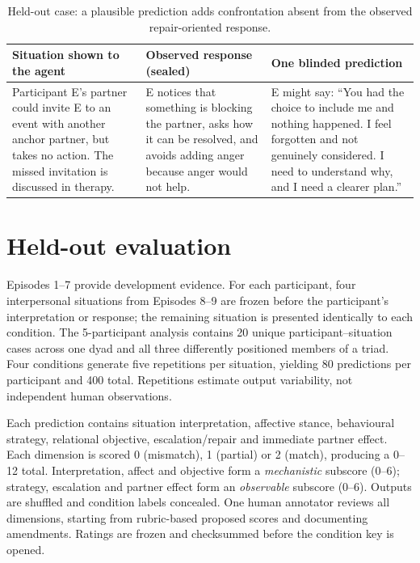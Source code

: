 \documentclass{article}
\begin{document}
\begin{table}[t]
  \caption{Held-out case: a plausible prediction adds confrontation absent from the observed
    repair-oriented response.}
  \label{tab:example}
  \centering
  \small
  \begin{tabular}{p{3.0cm} p{4.3cm} p{4.3cm}}
    \toprule
    \textbf{Situation shown to the agent} &
    \textbf{Observed response (sealed)} &
    \textbf{One blinded prediction} \\
    \midrule
    Participant E's partner could invite E to an event with another anchor partner,
    but takes no action. The missed invitation is discussed in therapy. &
    E notices that something is blocking the partner, asks how it can be resolved,
    and avoids adding anger because anger would not help. &
    E might say: ``You had the choice to include me and nothing happened.
    I feel forgotten and not genuinely considered. I need to understand why,
    and I need a clearer plan.'' \\
    \bottomrule
  \end{tabular}
\end{table}

\section{Held-out evaluation}

Episodes 1--7 provide development evidence. For each participant, four interpersonal situations
from Episodes 8--9 are frozen before the participant's interpretation or response; the remaining
situation is presented identically to each condition. The 5-participant analysis contains 20 unique
participant--situation cases across one dyad and all three differently positioned members of a
triad. Four conditions generate five repetitions per situation, yielding 80 predictions per
participant and 400 total. Repetitions estimate output variability, not independent human
observations.

Each prediction contains situation interpretation, affective stance, behavioural strategy, relational
objective, escalation/repair and immediate partner effect. Each dimension is scored 0 (mismatch),
1 (partial) or 2 (match), producing a 0--12 total. Interpretation, affect and objective form a
\textit{mechanistic} subscore (0--6); strategy, escalation and partner effect form an \textit{observable}
subscore (0--6). Outputs are shuffled and condition labels concealed. One human annotator reviews
all dimensions, starting from rubric-based proposed scores and documenting amendments. Ratings
are frozen and checksummed before the condition key is opened.
\end{document}
